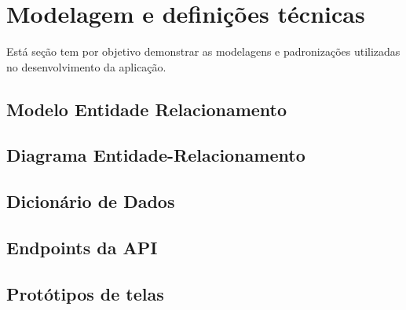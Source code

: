 \section{Modelagem e definições técnicas}
Está seção tem por objetivo demonstrar as modelagens e padronizações utilizadas no desenvolvimento da aplicação.

\subsection{Modelo Entidade Relacionamento}


\subsection{Diagrama Entidade-Relacionamento}


\subsection{Dicionário de Dados}


\subsection{Endpoints da API}


\subsection{Protótipos de telas}